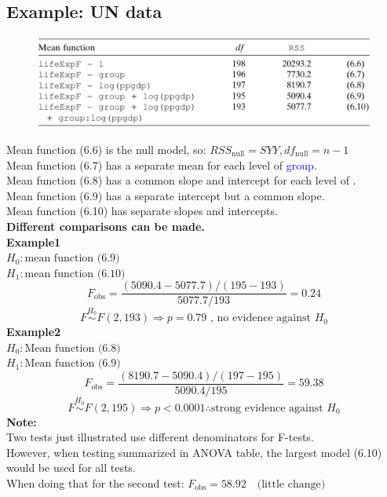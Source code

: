 \documentclass[14pt]{extarticle}
\begin{document}
\subsection*{Example: UN data}
\begin{figure}[H]
    \centering
    \includegraphics[width=1\textwidth]{fig2.png}
\end{figure}
\noindent
Mean function (6.6) is the null model, so: $RSS_{\text{null}} = SYY, df_{\text{null}} = n - 1$\\
Mean function (6.7) has a separate mean for each level of \textcolor{blue}{group}.\\
Mean function (6.8) has a common slope and intercept for each level of \textcolor{blue}{}.\\
Mean function (6.9) has a separate intercept but a common slope.\\
Mean function (6.10) has separate slopes and intercepts.\\
\textbf{Different comparisons can be made.}\\
\textbf{Example1}\\
$H_0: \text{mean function (6.9)}$ \\
$H_1: \text{mean function (6.10)}$
\[
F_{\text{obs}} = \frac{(5090.4 - 5077.7) / (195 - 193)}{5077.7 / 193}
 = 0.24
\]
\[
F \overset{H_0}{\sim} F(2, 193) 
\Rightarrow p = 0.79 \text{ , no evidence against } H_0
\]
\textbf{Example2}\\
$H_0: \text{Mean function (6.8)}$\\
$H_1: \text{Mean function (6.9)}$
\[
F_{\text{obs}} = \frac{(8190.7 - 5090.4) / (197 - 195)}{5090.4 / 195} = 59.38
\]
\[
F \overset{H_0}{\sim} F(2, 195)
\Rightarrow p < 0.0001 \therefore \text{strong evidence against } H_0
\]
\textbf{Note:}\\
Two tests just illustrated use different denominators for F-tests.\\
However, when testing summarized in ANOVA table, the largest model (6.10) would be used for all tests.\\
When doing that for the second test: $F_{\text{obs}} = 58.92 \quad \text{(little change)}$
\end{document}
